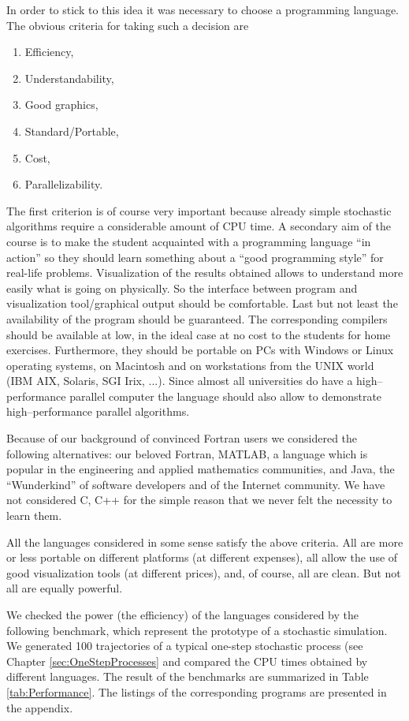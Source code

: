 In order to stick to this idea it was necessary to choose a programming 
language. The obvious criteria for taking such a decision are
\cite[]{GARCIA}
\begin{enumerate}
\item Efficiency,
\item Understandability,
\item Good graphics,
\item Standard/Portable,
\item Cost,
\item Parallelizability.
\end{enumerate}
The first criterion is of course very important because already simple 
stochastic algorithms require a considerable amount of CPU time.
A secondary aim of the course is to make the student acquainted with a 
programming language ``in action'' so they should learn something 
about a ``good 
programming style'' for real-life problems. Visualization of the results 
obtained allows to understand more easily what is going on physically. So 
the interface between program and visualization tool/graphical output should
be comfortable. Last but not least the availability of the program should be
guaranteed. The corresponding compilers should be available at low, in the 
ideal case at no cost to the students for home exercises. Furthermore, they
should be portable on PCs with Windows or Linux operating systems, on Macintosh
and on workstations from the UNIX world (IBM AIX, Solaris, SGI Irix, ...).
Since almost all universities do have a high--performance parallel computer 
the language should also allow to demonstrate high--performance parallel 
algorithms.

Because of our background of convinced Fortran users we considered the 
following alternatives: our beloved Fortran, MATLAB, a language which 
is popular in 
the engineering and applied mathematics communities, and Java, the 
``Wunderkind'' of software developers and of the Internet community. We have 
not considered C, C++ for the simple reason that we never felt the necessity 
to learn them.

All the languages considered  in some sense satisfy the above criteria. All
are more  or less portable on different platforms (at different expenses), all
allow the use of good visualization tools (at different prices), and, of 
course, all are clean. But not all are equally powerful. 

We checked the power (the efficiency) of the languages considered by the 
following benchmark, which represent the prototype of a stochastic simulation. 
We generated 100 trajectories of a typical one-step stochastic process
(see Chapter \ref{sec:OneStepProcesses}
and compared the CPU times obtained by different languages. The result
of the benchmarks are summarized in Table \ref{tab:Performance}. The listings
of the corresponding programs are presented in the appendix.

